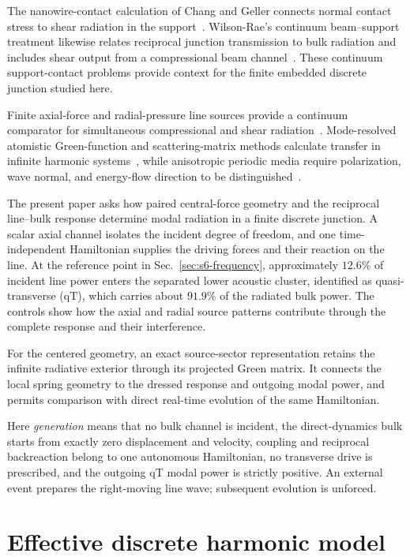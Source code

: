 \documentclass[10pt,aps,pre,reprint,floatfix,notitlepage,nofootinbib]{revtex4-2}
\begin{document}
The nanowire-contact calculation of Chang and Geller connects normal contact stress to shear radiation in the support~\cite{ChangGeller2005}. Wilson-Rae's continuum beam--support treatment likewise relates reciprocal junction transmission to bulk radiation and includes shear output from a compressional beam channel~\cite{WilsonRae2008}. These continuum support-contact problems provide context for the finite embedded discrete junction studied here.

Finite axial-force and radial-pressure line sources provide a continuum comparator for simultaneous compressional and shear radiation~\cite{Aldridge1998}. Mode-resolved atomistic Green-function and scattering-matrix methods calculate transfer in infinite harmonic systems~\cite{Ong2018,Sadasivam2017,Khodavirdi2024}, while anisotropic periodic media require polarization, wave normal, and energy-flow direction to be distinguished~\cite{Spies1994,Bacigalupo2018}.

The present paper asks how paired central-force geometry and the reciprocal line--bulk response determine modal radiation in a finite discrete junction. A scalar axial channel isolates the incident degree of freedom, and one time-independent Hamiltonian supplies the driving forces and their reaction on the line. At the reference point in Sec.~\ref{sec:s6-frequency}, approximately $12.6\%$ of incident line power enters the separated lower acoustic cluster, identified as quasi-transverse (qT), which carries about $91.9\%$ of the radiated bulk power. The controls show how the axial and radial source patterns contribute through the complete response and their interference.

For the centered geometry, an exact source-sector representation retains the infinite radiative exterior through its projected Green matrix. It connects the local spring geometry to the dressed response and outgoing modal power, and permits comparison with direct real-time evolution of the same Hamiltonian.

Here \emph{generation} means that no bulk channel is incident, the direct-dynamics bulk starts from exactly zero displacement and velocity, coupling and reciprocal backreaction belong to one autonomous Hamiltonian, no transverse drive is prescribed, and the outgoing qT modal power is strictly positive. An external event prepares the right-moving line wave; subsequent evolution is unforced.

\section{Effective discrete harmonic model}
\label{sec:s2-model}
\end{document}
